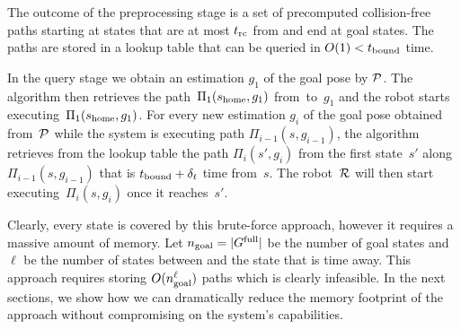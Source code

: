 \documentclass[conference]{IEEEtran}
\begin{document}
The outcome of the preprocessing stage is a set of precomputed collision-free paths starting at states that are at most $t_{\textrm{rc}}$ from \Shome and end at goal states.
The paths are stored in a lookup table that can be queried in $O(1) < t_{\textrm{bound}}$ time.

In the query stage we obtain an estimation $g_1$ of the goal pose by $\mathcal{P}$. 
The algorithm then retrieves the path~$\Pi_1(s_{\textrm{home}},g_1)$ from~\Shome to~$g_1$ and the robot starts executing~$\Pi_1(s_{\textrm{home}},g_1)$.
%
For every new estimation $g_i$ of the goal pose obtained from~$\mathcal{P}$  while the system is executing path $\Pi_{i-1}(s,g_{i-1})$, the algorithm retrieves from the lookup table the path $\Pi_i(s',g_i)$ from the first state~$s'$ along $\Pi_{i-1}(s,g_{i-1})$ that is $t_{\textrm{bound}} + \delta_t$ time from~$s$. The robot~$\mathcal{R}$ will then start executing~$\Pi_i(s,g_i)$ once it reaches~$s'$.

Clearly, every state is covered by this brute-force approach, however it requires a massive amount of memory.
Let $n_{\rm goal} = \vert G^{\textrm{full}} \vert$ be the number of goal states and
$\ell$ be the number of states between \Shome and the state that is \Trc time away.
This approach requires storing $O(n_{\rm goal}^\ell)$ paths which is clearly infeasible.
In the next sections, we show how we can dramatically reduce the memory footprint of the approach without compromising on the system's capabilities.
\end{document}

